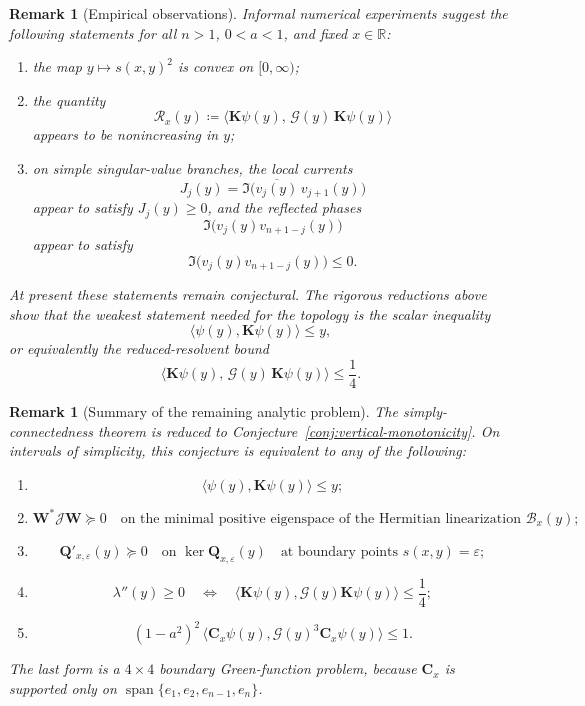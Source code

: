 \documentclass[11pt]{article}
\newtheorem{remark}[theorem]{Remark}
\begin{document}
\begin{remark}[Empirical observations]\label{rem:numerics}
Informal numerical experiments suggest the following statements for all \(n>1\), \(0<a<1\), and fixed \(x\in\mathbb R\):
\begin{enumerate}
\item the map \(y\mapsto s(x,y)^2\) is convex on \([0,\infty)\);
\item the quantity
\[
\mathcal R_x(y)\coloneqq \bigl\langle \mathbf K\psi(y),\,\mathcal G(y)\,\mathbf K\psi(y)\bigr\rangle
\]
appears to be nonincreasing in \(y\);
\item on simple singular-value branches, the local currents
\[
J_j(y)=\Im\!\bigl(\overline{v_j(y)}\,v_{j+1}(y)\bigr)
\]
appear to satisfy \(J_j(y)\ge 0\), and the reflected phases
\[
\Im\!\bigl(v_j(y)v_{n+1-j}(y)\bigr)
\]
appear to satisfy
\[
\Im\!\bigl(v_j(y)v_{n+1-j}(y)\bigr)\le 0.
\]
\end{enumerate}
At present these statements remain conjectural.  The rigorous reductions above show that the weakest statement needed for the topology is the scalar inequality
\[
\langle \psi(y),\mathbf K\psi(y)\rangle\le y,
\]
or equivalently the reduced-resolvent bound
\[
\bigl\langle \mathbf K\psi(y),\,\mathcal G(y)\,\mathbf K\psi(y)\bigr\rangle\le \frac14.
\]
\end{remark}

\begin{remark}[Summary of the remaining analytic problem]
The simply-connectedness theorem is reduced to Conjecture~\ref{conj:vertical-monotonicity}.  On intervals of simplicity, this conjecture is equivalent to any of the following:
\begin{enumerate}
\item
\[
\langle \psi(y),\mathbf K\psi(y)\rangle\le y;
\]
\item
\[
\mathbf W^*\mathcal J\mathbf W\succeq 0
\quad\text{on the minimal positive eigenspace of the Hermitian linearization }\mathcal B_x(y);
\]
\item
\[
\mathbf Q'_{x,\varepsilon}(y)\succeq 0
\quad\text{on }\ker \mathbf Q_{x,\varepsilon}(y)
\quad\text{at boundary points }s(x,y)=\varepsilon;
\]
\item
\[
\lambda''(y)\ge 0
\quad\Longleftrightarrow\quad
\bigl\langle \mathbf K\psi(y),\mathcal G(y)\mathbf K\psi(y)\bigr\rangle\le \frac14;
\]
\item
\[
(1-a^2)^2\,
\bigl\langle \mathbf C_x\psi(y),\mathcal G(y)^3\mathbf C_x\psi(y)\bigr\rangle\le 1.
\]
\end{enumerate}
The last form is a \(4\times 4\) boundary Green-function problem, because \(\mathbf C_x\) is supported only on \(\operatorname{span}\{e_1,e_2,e_{n-1},e_n\}\).
\end{remark}
\end{document}
